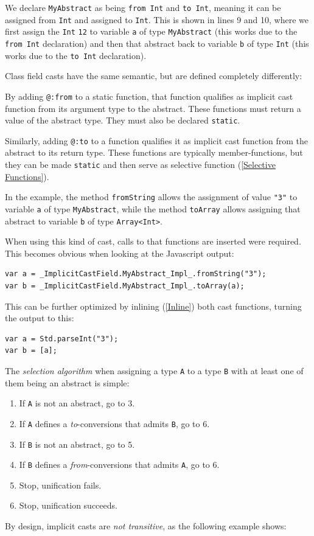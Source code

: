 \documentclass{article}
\newcommand{\target}[1]{#1}
\newcommand{\type}[1]{\texttt{#1}}
\newcommand{\expr}[1]{\texttt{#1}}
\newcommand{\tref}[2]{#1 (\ref{#2})}
\begin{document}

We declare \type{MyAbstract} as being \expr{from Int} and \expr{to Int}, meaning it can be assigned from \type{Int} and assigned to \type{Int}. This is shown in lines 9 and 10, where we first assign the \type{Int} \expr{12} to variable \expr{a} of type \type{MyAbstract} (this works due to the \expr{from Int} declaration) and then that abstract back to variable \expr{b} of type \type{Int} (this works due to the \expr{to Int} declaration).

Class field casts have the same semantic, but are defined completely differently:


By adding \expr{@:from} to a static function, that function qualifies as implicit cast function from its argument type to the abstract. These functions must return a value of the abstract type. They must also be declared \expr{static}.

Similarly, adding \expr{@:to} to a function qualifies it as implicit cast function from the abstract to its return type. These functions are typically member-functions, but they can be made \expr{static} and then serve as \tref{selective function}{Selective Functions}.

In the example, the method \expr{fromString} allows the assignment of value \expr{"3"} to variable \expr{a} of type \type{MyAbstract}, while the method \expr{toArray} allows assigning that abstract to variable \expr{b} of type \type{Array<Int>}.

When using this kind of cast, calls to that functions are inserted were required. This becomes obvious when looking at the \target{Javascript} output:

\begin{lstlisting}
var a = _ImplicitCastField.MyAbstract_Impl_.fromString("3");
var b = _ImplicitCastField.MyAbstract_Impl_.toArray(a);
\end{lstlisting}
This can be further optimized by \tref{inlining}{Inline} both cast functions, turning the output to this:

\begin{lstlisting}
var a = Std.parseInt("3");
var b = [a];
\end{lstlisting}
The \emph{selection algorithm} when assigning a type \expr{A} to a type \expr{B} with at least one of them being an abstract is simple:

\begin{enumerate}
	\item If \expr{A} is not an abstract, go to 3.
	\item If \expr{A} defines a \emph{to}-conversions that admits \expr{B}, go to 6.
	\item If \expr{B} is not an abstract, go to 5.
	\item If \expr{B} defines a \emph{from}-conversions that admits \expr{A}, go to 6.
	\item Stop, unification fails.
	\item Stop, unification succeeds.
\end{enumerate}
By design, implicit casts are \emph{not transitive}, as the following example shows:
\end{document}
